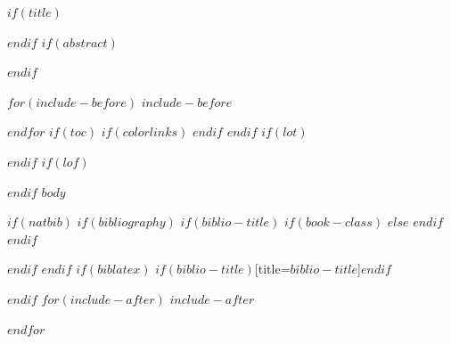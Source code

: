 \documentclass[$if(fontsize)$$fontsize$,$endif$$if(lang)$$babel-lang$,$endif$$if(papersize)$$papersize$paper,$endif$$for(classoption)$$classoption$$sep$,$endfor$]{$documentclass$}
\begin{document}
$if(title)$
\maketitle
$endif$
$if(abstract)$
\begin{abstract}
$abstract$
\end{abstract}
$endif$

$for(include-before)$
$include-before$

$endfor$
$if(toc)$
{
$if(colorlinks)$
\hypersetup{linkcolor=$if(toccolor)$$toccolor$$else$black$endif$}
$endif$
\setcounter{tocdepth}{$toc-depth$}
\tableofcontents
}
$endif$
$if(lot)$
\listoftables
$endif$
$if(lof)$
\listoffigures
$endif$
$body$

$if(natbib)$
$if(bibliography)$
$if(biblio-title)$
$if(book-class)$
\renewcommand\bibname{$biblio-title$}
$else$
\renewcommand\refname{$biblio-title$}
$endif$
$endif$


$endif$
$endif$
$if(biblatex)$
\printbibliography$if(biblio-title)$[title=$biblio-title$]$endif$

$endif$
$for(include-after)$
$include-after$

$endfor$
\end{document}
